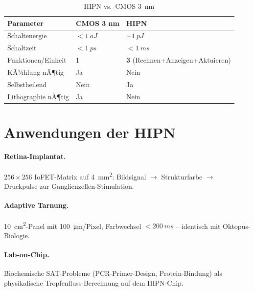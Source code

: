 ﻿\documentclass[a4paper,12pt]{scrreprt}
\theoremstyle{definition}
\begin{document}
\begin{table}[H]
\small
\caption{HIPN vs.\ CMOS \SI{3}{nm}}
\label{tab:nf2_vergleich}
\begin{tabular}{lll}
\toprule
\textbf{Parameter} & \textbf{CMOS 3 nm} & \textbf{HIPN} \\
\midrule
Schaltenergie       & $<\SI{1}{aJ}$      & $\sim\SI{1}{pJ}$ \\
Schaltzeit          & $<\SI{1}{ps}$      & $<\SI{1}{ms}$ \\
Funktionen/Einheit  & 1                  & \textbf{3} (Rechnen+Anzeigen+Aktuieren) \\
KÃ¼hlung nÃ¶tig       & Ja                 & Nein \\
Selbstheilend       & Nein               & Ja \\
Lithographie nÃ¶tig  & Ja                 & Nein \\
\bottomrule
\end{tabular}
\end{table}

\section{Anwendungen der HIPN}

\paragraph{Retina-Implantat.} $256\times 256$ IoFET-Matrix auf
\SI{4}{mm^2}: Bildsignal $\to$ Strukturfarbe $\to$ Druckpulse zur
Ganglienzellen-Stimulation.

\paragraph{Adaptive Tarnung.} \SI{10}{cm^2}-Panel mit \SI{100}{\micro m}/Pixel,
Farbwechsel $<\SI{200}{ms}$ -- identisch mit Oktopus-Biologie.

\paragraph{Lab-on-Chip.} Biochemische SAT-Probleme (PCR-Primer-Design,
Protein-Bindung) als physikalische Tropfenfluss-Berechnung auf dem
HIPN-Chip.

\end{document}
